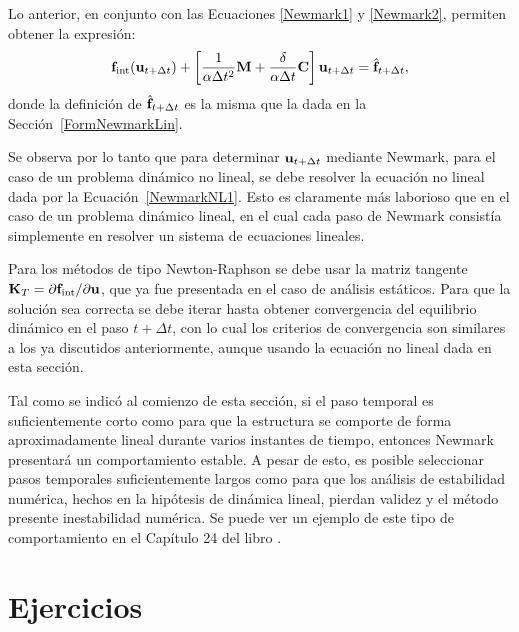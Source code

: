 Lo anterior, en conjunto con las Ecuaciones \eqref{Newmark1} y \eqref{Newmark2}, permiten obtener la expresión:
%
\begin{equation}\label{NewmarkNL1}
{\bf f}_{\text{int}}({\bf u}_{t+\Delta t})+\left[ \frac{1}{\alpha \Delta t^2} {\bf M} + \frac{\delta}{\alpha \Delta t} {\bf C} \right] {\bf u}_{t+\Delta t} = \hat{{\bf f}}_{t+\Delta t},
\end{equation}
%
donde la definición de $\hat{{\bf f}}_{t+\Delta t}$ es la misma que la dada en la Sección~\ref{FormNewmarkLin}. %

Se observa por lo tanto que para determinar ${\bf u}_{t+\Delta t}$ mediante Newmark, para el caso de un problema dinámico no lineal, se debe resolver la ecuación no lineal dada por la Ecuación~\eqref{NewmarkNL1}. %
%
Esto es claramente más laborioso que en el caso de un problema dinámico lineal, en el cual cada paso de Newmark consistía simplemente en resolver un sistema de ecuaciones lineales.


Para los métodos de tipo Newton-Raphson se debe usar la matriz tangente ${\bf K}_T = \partial {\bf f}_{\text{int}} / \partial {\bf u}$, que ya fue presentada en el caso de análisis estáticos. %
%
Para que la solución sea correcta se debe iterar hasta obtener convergencia del equilibrio dinámico en el paso $t+\Delta t$, con lo cual los criterios de convergencia son similares a los ya discutidos anteriormente, aunque usando la ecuación no lineal dada en esta sección.

Tal como se indicó al comienzo de esta sección, si el paso temporal es suficientemente corto como para que la estructura se comporte de forma aproximadamente lineal durante varios instantes de tiempo, entonces Newmark presentará un comportamiento estable. A pesar de esto, es posible seleccionar pasos temporales suficientemente largos como para que los análisis de estabilidad numérica, hechos en la hipótesis de dinámica lineal, pierdan validez y el método presente inestabilidad numérica. %
%
Se puede ver un ejemplo de este tipo de comportamiento en el Capítulo 24 del libro \citep{Crisfield1997}.




\section{Ejercicios}

